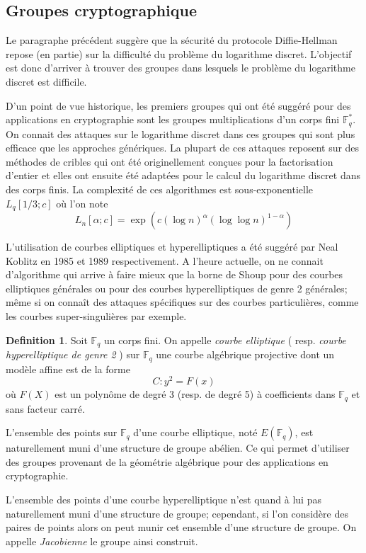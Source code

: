 \documentclass[a4paper]{article}
\theoremstyle{definition}
\newtheorem{definition}{Definition}[section]
\theoremstyle{remark}
\numberwithin{equation}{section}
\begin{document}
\subsection{Groupes cryptographique}
Le paragraphe précédent suggère que la sécurité du protocole Diffie-Hellman repose (en partie) sur la difficulté du problème du logarithme discret. L'objectif est donc d'arriver à trouver des groupes dans lesquels le problème du logarithme discret est difficile.

D'un point de vue historique, les premiers groupes qui ont été suggéré pour des applications en cryptographie sont les groupes multiplications d'un corps fini $\mathbb{F}^*_q$. On connait des attaques sur le logarithme discret dans ces groupes qui sont plus efficace que les approches génériques. La plupart de ces attaques reposent sur des méthodes de cribles qui ont été originellement conçues pour la factorisation d'entier et elles ont ensuite été adaptées pour le calcul du logarithme discret dans des corps finis. La complexité de ces algorithmes est sous-exponentielle $L_q[1/3;c]$ où l'on note
$$L_n[\alpha;c] = \exp(c(\log n)^\alpha(\log \log n)^{1-\alpha})$$

L'utilisation de courbes elliptiques et hyperelliptiques a été suggéré par Neal Koblitz \cite{koblitz1} \cite{koblitz2} en 1985 et 1989 respectivement. A l'heure actuelle, on ne connait d'algorithme qui arrive à faire mieux que la borne de Shoup pour des courbes elliptiques générales ou pour des courbes hyperelliptiques de genre 2 générales; même si on connaît des attaques spécifiques sur des courbes particulières, comme les courbes super-singulières par exemple.

\begin{definition}
Soit $\mathbb{F}_q$ un corps fini.
On appelle \emph{courbe elliptique} ( resp. \emph{courbe hyperelliptique de genre 2} ) sur $\mathbb{F}_q$ une courbe algébrique projective dont un modèle affine est de la forme
$$C : y^2 = F(x)$$
où $F(X)$ est un polynôme de degré 3 (resp. de degré 5) à coefficients dans $\mathbb{F}_q$ et sans facteur carré.
\end{definition}

L'ensemble des points sur $\mathbb{F}_q$ d'une courbe elliptique, noté $E(\mathbb{F}_q)$, est naturellement muni d'une structure de groupe abélien. Ce qui permet d'utiliser des groupes provenant de la géométrie algébrique pour des applications en cryptographie.

L'ensemble des points d'une courbe hyperelliptique n'est quand à lui pas naturellement muni d'une structure de groupe; cependant, si l'on considère des paires de points alors on peut munir cet ensemble d'une structure de groupe. On appelle \emph{Jacobienne} le groupe ainsi construit.
\end{document}
